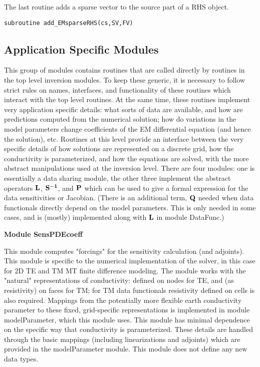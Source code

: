 \documentclass[12pt]{article}
\begin{document}
The last routine adds a sparse vector to the source part
of a RHS object.

\begin{verbatim}
subroutine add_EMsparseRHS(cs,SV,FV)
\end{verbatim}

\subsection{Application Specific Modules}

This group of modules contains routines that are
called directly by routines in the top level inversion
modules.  To keep these generic, it is necessary to
follow strict rules on names, interfaces, and functionality
of these routines which interact with the top level routines.
At the same time, these routines implement very application
specific details: what sorts of data are available, and
how are predictions computed from the numerical solution;
how do variations in the model parameters change coefficients
of the EM differential equation (and hence the solution), etc.
Routines at this level provide an interface between
the very specific details of how solutions are represented
on a discrete grid, how the conductivity is parameterized,
and how the equations are solved, with the more abstract
manipulations used at the inversion level.  There are four
modules: one is essentially a data sharing module, the other
three implement the abstract operators $\bf L$, $\bf S^{-1}$,
and ${\bf P}$ which can be used to give a formal expression
for the data sensitivities or Jacobian.  (There is an additional
term, ${\bf Q}$ needed when data functionals directly depend
on the model parameters.  This is only needed in some cases,
and is (mostly) implemented along with $\bf L$ in module DataFunc.)

\vspace{10pt}

\noindent
{\bf Module SensPDEcoeff}

This module computes "forcings" for the sensitivity calculation
(and adjoints).  This module is specific to the numerical
implementation of the solver, in this case for 2D TE and TM
MT finite difference modeling.   The module works with the
"natural" representations of conductivity: defined on nodes
for TE, and (as resistivity) on faces for TM; for TM data functionals resistivity
defined on cells is also required.  Mappings from the potentially
more flexible earth conductivity parameter to these fixed,
grid-specific representations is implemented in module modelParameter,
which this module uses.  This module has minimal dependence on the 
specific way that conductivity is parameterized.  These details
are handled through the basic mappings (including linearizations 
and adjoints) which are provided in the modelParameter module.
This module does not define any new data types.
\end{document}
